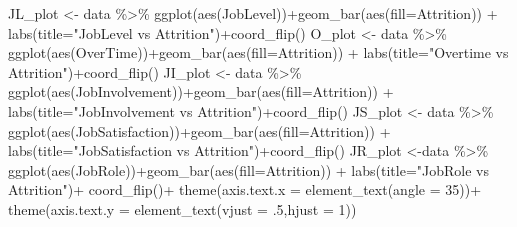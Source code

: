\documentclass[
]{article}
\newenvironment{Shaded}{\begin{snugshade}}{\end{snugshade}}
\newcommand{\AttributeTok}[1]{\textcolor[rgb]{0.77,0.63,0.00}{#1}}
\newcommand{\DecValTok}[1]{\textcolor[rgb]{0.00,0.00,0.81}{#1}}
\newcommand{\FunctionTok}[1]{\textcolor[rgb]{0.00,0.00,0.00}{#1}}
\newcommand{\NormalTok}[1]{#1}
\newcommand{\OtherTok}[1]{\textcolor[rgb]{0.56,0.35,0.01}{#1}}
\newcommand{\SpecialCharTok}[1]{\textcolor[rgb]{0.00,0.00,0.00}{#1}}
\newcommand{\StringTok}[1]{\textcolor[rgb]{0.31,0.60,0.02}{#1}}
\begin{document}
\begin{Shaded}
\begin{Highlighting}[]
\NormalTok{JL\_plot }\OtherTok{\textless{}{-}}\NormalTok{ data }\SpecialCharTok{\%\textgreater{}\%} \FunctionTok{ggplot}\NormalTok{(}\FunctionTok{aes}\NormalTok{(JobLevel))}\SpecialCharTok{+}\FunctionTok{geom\_bar}\NormalTok{(}\FunctionTok{aes}\NormalTok{(}\AttributeTok{fill=}\NormalTok{Attrition)) }\SpecialCharTok{+} \FunctionTok{labs}\NormalTok{(}\AttributeTok{title=}\StringTok{"JobLevel vs Attrition"}\NormalTok{)}\SpecialCharTok{+}\FunctionTok{coord\_flip}\NormalTok{()}
\NormalTok{O\_plot }\OtherTok{\textless{}{-}}\NormalTok{ data }\SpecialCharTok{\%\textgreater{}\%} \FunctionTok{ggplot}\NormalTok{(}\FunctionTok{aes}\NormalTok{(OverTime))}\SpecialCharTok{+}\FunctionTok{geom\_bar}\NormalTok{(}\FunctionTok{aes}\NormalTok{(}\AttributeTok{fill=}\NormalTok{Attrition)) }\SpecialCharTok{+} \FunctionTok{labs}\NormalTok{(}\AttributeTok{title=}\StringTok{"Overtime vs Attrition"}\NormalTok{)}\SpecialCharTok{+}\FunctionTok{coord\_flip}\NormalTok{()}
\NormalTok{JI\_plot }\OtherTok{\textless{}{-}}\NormalTok{ data }\SpecialCharTok{\%\textgreater{}\%} \FunctionTok{ggplot}\NormalTok{(}\FunctionTok{aes}\NormalTok{(JobInvolvement))}\SpecialCharTok{+}\FunctionTok{geom\_bar}\NormalTok{(}\FunctionTok{aes}\NormalTok{(}\AttributeTok{fill=}\NormalTok{Attrition)) }\SpecialCharTok{+} \FunctionTok{labs}\NormalTok{(}\AttributeTok{title=}\StringTok{"JobInvolvement vs Attrition"}\NormalTok{)}\SpecialCharTok{+}\FunctionTok{coord\_flip}\NormalTok{()}
\NormalTok{JS\_plot }\OtherTok{\textless{}{-}}\NormalTok{ data }\SpecialCharTok{\%\textgreater{}\%} \FunctionTok{ggplot}\NormalTok{(}\FunctionTok{aes}\NormalTok{(JobSatisfaction))}\SpecialCharTok{+}\FunctionTok{geom\_bar}\NormalTok{(}\FunctionTok{aes}\NormalTok{(}\AttributeTok{fill=}\NormalTok{Attrition)) }\SpecialCharTok{+} \FunctionTok{labs}\NormalTok{(}\AttributeTok{title=}\StringTok{"JobSatisfaction vs Attrition"}\NormalTok{)}\SpecialCharTok{+}\FunctionTok{coord\_flip}\NormalTok{()}
\NormalTok{JR\_plot }\OtherTok{\textless{}{-}}\NormalTok{data }\SpecialCharTok{\%\textgreater{}\%} \FunctionTok{ggplot}\NormalTok{(}\FunctionTok{aes}\NormalTok{(JobRole))}\SpecialCharTok{+}\FunctionTok{geom\_bar}\NormalTok{(}\FunctionTok{aes}\NormalTok{(}\AttributeTok{fill=}\NormalTok{Attrition)) }\SpecialCharTok{+} \FunctionTok{labs}\NormalTok{(}\AttributeTok{title=}\StringTok{"JobRole vs Attrition"}\NormalTok{)}\SpecialCharTok{+} \FunctionTok{coord\_flip}\NormalTok{()}\SpecialCharTok{+} \FunctionTok{theme}\NormalTok{(}\AttributeTok{axis.text.x =} \FunctionTok{element\_text}\NormalTok{(}\AttributeTok{angle =} \DecValTok{35}\NormalTok{))}\SpecialCharTok{+} \FunctionTok{theme}\NormalTok{(}\AttributeTok{axis.text.y =} \FunctionTok{element\_text}\NormalTok{(}\AttributeTok{vjust =}\NormalTok{ .}\DecValTok{5}\NormalTok{,}\AttributeTok{hjust =} \DecValTok{1}\NormalTok{))}

\end{Highlighting}
\end{Shaded}
\end{document}
